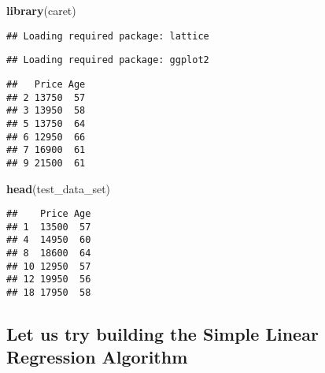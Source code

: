 \documentclass[]{article}
\newenvironment{Shaded}{\begin{snugshade}}{\end{snugshade}}
\newcommand{\DataTypeTok}[1]{\textcolor[rgb]{0.13,0.29,0.53}{#1}}
\newcommand{\FloatTok}[1]{\textcolor[rgb]{0.00,0.00,0.81}{#1}}
\newcommand{\KeywordTok}[1]{\textcolor[rgb]{0.13,0.29,0.53}{\textbf{#1}}}
\newcommand{\NormalTok}[1]{#1}
\newcommand{\OperatorTok}[1]{\textcolor[rgb]{0.81,0.36,0.00}{\textbf{#1}}}
\newcommand{\OtherTok}[1]{\textcolor[rgb]{0.56,0.35,0.01}{#1}}
\newcommand{\StringTok}[1]{\textcolor[rgb]{0.31,0.60,0.02}{#1}}
\begin{document}
\begin{Shaded}
\begin{Highlighting}[]
\KeywordTok{library}\NormalTok{(caret)}
\end{Highlighting}
\end{Shaded}

\begin{verbatim}
## Loading required package: lattice
\end{verbatim}

\begin{verbatim}
## Loading required package: ggplot2
\end{verbatim}

\begin{Shaded}
\end{Shaded}

\begin{verbatim}
##   Price Age
## 2 13750  57
## 3 13950  58
## 5 13750  64
## 6 12950  66
## 7 16900  61
## 9 21500  61
\end{verbatim}

\begin{Shaded}
\begin{Highlighting}[]
\KeywordTok{head}\NormalTok{(test_data_set)}
\end{Highlighting}
\end{Shaded}

\begin{verbatim}
##    Price Age
## 1  13500  57
## 4  14950  60
## 8  18600  64
## 10 12950  57
## 12 19950  56
## 18 17950  58
\end{verbatim}

\hypertarget{let-us-try-building-the-simple-linear-regression-algorithm}{%
\subsection{Let us try building the Simple Linear Regression
Algorithm}\label{let-us-try-building-the-simple-linear-regression-algorithm}}
\end{document}

